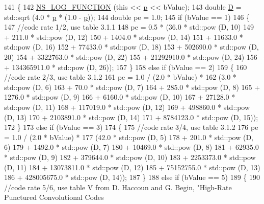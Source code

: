 \begin{DoxyCode}
141 \{
142   \hyperlink{log-macros-disabled_8h_a90b90d5bad1f39cb1b64923ea94c0761}{NS\_LOG\_FUNCTION} (\textcolor{keyword}{this} << \hyperlink{lte__link__budget_8m_ac9de518908a968428863f829398a4e62}{p} << bValue);
143   \textcolor{keywordtype}{double} \hyperlink{generate__test__data__lte__sinr_8m_a0115b1ac410615c4a6259e2e984fe274}{D} = std::sqrt (4.0 * \hyperlink{lte__link__budget_8m_ac9de518908a968428863f829398a4e62}{p} * (1.0 - \hyperlink{lte__link__budget_8m_ac9de518908a968428863f829398a4e62}{p}));
144   \textcolor{keywordtype}{double} pe = 1.0;
145   \textcolor{keywordflow}{if} (bValue == 1)
146     \{
147       \textcolor{comment}{//code rate 1/2, use table 3.1.1}
148       pe = 0.5 * (36.0 * std::pow (D, 10)
149                   + 211.0 * std::pow (D, 12)
150                   + 1404.0 * std::pow (D, 14)
151                   + 11633.0 * std::pow (D, 16)
152                   + 77433.0 * std::pow (D, 18)
153                   + 502690.0 * std::pow (D, 20)
154                   + 3322763.0 * std::pow (D, 22)
155                   + 21292910.0 * std::pow (D, 24)
156                   + 134365911.0 * std::pow (D, 26));
157     \}
158   \textcolor{keywordflow}{else} \textcolor{keywordflow}{if} (bValue == 2)
159     \{
160       \textcolor{comment}{//code rate 2/3, use table 3.1.2}
161       pe = 1.0 / (2.0 * bValue) *
162         (3.0 * std::pow (D, 6)
163          + 70.0 * std::pow (D, 7)
164          + 285.0 * std::pow (D, 8)
165          + 1276.0 * std::pow (D, 9)
166          + 6160.0 * std::pow (D, 10)
167          + 27128.0 * std::pow (D, 11)
168          + 117019.0 * std::pow (D, 12)
169          + 498860.0 * std::pow (D, 13)
170          + 2103891.0 * std::pow (D, 14)
171          + 8784123.0 * std::pow (D, 15));
172     \}
173   \textcolor{keywordflow}{else} \textcolor{keywordflow}{if} (bValue == 3)
174     \{
175       \textcolor{comment}{//code rate 3/4, use table 3.1.2}
176       pe = 1.0 / (2.0 * bValue) *
177         (42.0 * std::pow (D, 5)
178          + 201.0 * std::pow (D, 6)
179          + 1492.0 * std::pow (D, 7)
180          + 10469.0 * std::pow (D, 8)
181          + 62935.0 * std::pow (D, 9)
182          + 379644.0 * std::pow (D, 10)
183          + 2253373.0 * std::pow (D, 11)
184          + 13073811.0 * std::pow (D, 12)
185          + 75152755.0 * std::pow (D, 13)
186          + 428005675.0 * std::pow (D, 14));
187     \}
188   \textcolor{keywordflow}{else} \textcolor{keywordflow}{if} (bValue == 5)
189     \{
190       \textcolor{comment}{//code rate 5/6, use table V from D. Haccoun and G. Begin, "High-Rate Punctured Convolutional Codes}

\end{DoxyCode}
